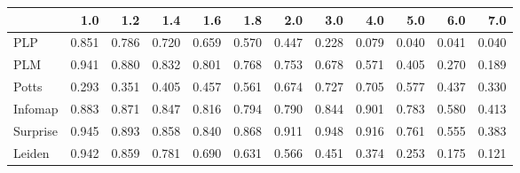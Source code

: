 \begin{tabular}{lrrrrrrrrrrr}
\toprule
{} &   1.0 &   1.2 &   1.4 &   1.6 &   1.8 &   2.0 &   3.0 &   4.0 &   5.0 &   6.0 &   7.0 \\
\midrule
PLP      & 0.851 & 0.786 & 0.720 & 0.659 & 0.570 & 0.447 & 0.228 & 0.079 & 0.040 & 0.041 & 0.040 \\
PLM      & 0.941 & 0.880 & 0.832 & 0.801 & 0.768 & 0.753 & 0.678 & 0.571 & 0.405 & 0.270 & 0.189 \\
Potts    & 0.293 & 0.351 & 0.405 & 0.457 & 0.561 & 0.674 & 0.727 & 0.705 & 0.577 & 0.437 & 0.330 \\
Infomap  & 0.883 & 0.871 & 0.847 & 0.816 & 0.794 & 0.790 & 0.844 & 0.901 & 0.783 & 0.580 & 0.413 \\
Surprise & 0.945 & 0.893 & 0.858 & 0.840 & 0.868 & 0.911 & 0.948 & 0.916 & 0.761 & 0.555 & 0.383 \\
Leiden   & 0.942 & 0.859 & 0.781 & 0.690 & 0.631 & 0.566 & 0.451 & 0.374 & 0.253 & 0.175 & 0.121 \\
\bottomrule
\end{tabular}
